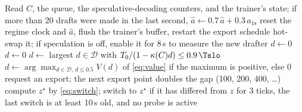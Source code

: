 \begin{algorithm}[!htbp]
\caption{One control tick (every second).}
\label{alg:controller}
\begin{algorithmic}[1]
\STATE Read $C$, the queue, the speculative-decoding counters, and the trainer's state; if more than 20 drafts were made in the last second, $\hat a\leftarrow0.7\,\hat a+0.3\,a_{\mathrm{1s}}$
\STATE reset the regime clock and $\hat a$, flush the trainer's buffer, restart the export schedule
\ENDIF
{}
\STATE hot-swap it; if speculation is off, enable it for 8\,s to measure the new drafter
\ENDIF
{}
\STATE $d\leftarrow0$
\STATE $d\leftarrow0$ 
\STATE $d\leftarrow$ largest $d\in\mathcal D$ with $T_0/(1-\kappa(C)d)\le0.9\,\Tslo$
\ELSE
\STATE $d\leftarrow\arg\max_{d\in\mathcal D,\,d\le0.5}V(d)$ of \cref{eq:value} if the maximum is positive, else $0$
\ENDIF
{}
\STATE request an export; the next export point doubles the gap (100, 200, 400, \dots)
\ENDIF
\STATE compute $z^{\star}$ by \cref{eq:switch}; switch to $z^{\star}$ if it has differed from $z$ for 3 ticks, the last switch is at least 10\,s old, and no probe is active
\end{algorithmic}
\end{algorithm}


